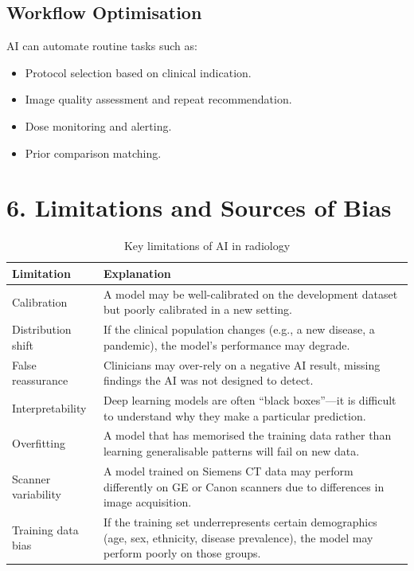 \subsection*{Workflow Optimisation}
AI can automate routine tasks such as:
\begin{itemize}
    \item Protocol selection based on clinical indication.
    \item Image quality assessment and repeat recommendation.
    \item Dose monitoring and alerting.
    \item Prior comparison matching.
\end{itemize}


\section*{6. Limitations and Sources of Bias}

\begin{table}[h]
\centering
\caption{Key limitations of AI in radiology}
\begin{tabular}{|l|p{8cm}|}
\hline
\textbf{Limitation} & \textbf{Explanation} \\
\hline
Calibration & A model may be well-calibrated on the development dataset but poorly calibrated in a new setting. \\
\hline
Distribution shift & If the clinical population changes (e.g., a new disease, a pandemic), the model's performance may degrade. \\
\hline
False reassurance & Clinicians may over-rely on a negative AI result, missing findings the AI was not designed to detect. \\
\hline
Interpretability & Deep learning models are often ``black boxes''---it is difficult to understand why they make a particular prediction. \\
\hline
Overfitting & A model that has memorised the training data rather than learning generalisable patterns will fail on new data. \\
\hline
Scanner variability & A model trained on Siemens CT data may perform differently on GE or Canon scanners due to differences in image acquisition. \\
\hline
Training data bias & If the training set underrepresents certain demographics (age, sex, ethnicity, disease prevalence), the model may perform poorly on those groups. \\
\hline
\end{tabular}
\end{table}

